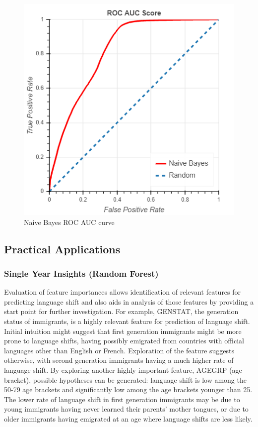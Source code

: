 \documentclass[10pt, conference, compsocconf]{IEEEtran}
\begin{document}
\begin{figure}
  \includegraphics[scale=0.45]{naive_bayes_roc}
  \centering
  \caption{Naive Bayes ROC AUC curve}
  \label{fig:naive_bayes_roc}
\end{figure}

\subsection{Practical Applications}

\subsubsection{Single Year Insights (Random Forest)}

Evaluation of feature importances allows identification of relevant features for predicting language shift and also aids in analysis of those features by providing a start point for further investigation.  For example, GENSTAT, the generation status of immigrants, is a highly relevant feature for prediction of language shift.  Initial intuition might suggest that first generation immigrants might be more prone to language shifts, having possibly emigrated from countries with official languages other than English or French.  Exploration of the feature suggests otherwise, with second generation immigrants having a much higher rate of language shift.  By exploring another highly important feature, AGEGRP (age bracket), possible hypotheses can be generated: language shift is low among the 50-79 age brackets and significantly low among the age brackets younger than 25.  The lower rate of language shift in first generation immigrants may be due to young immigrants having never learned their parents' mother tongues, or due to older immigrants having emigrated at an age where language shifts are less likely.
\end{document}
